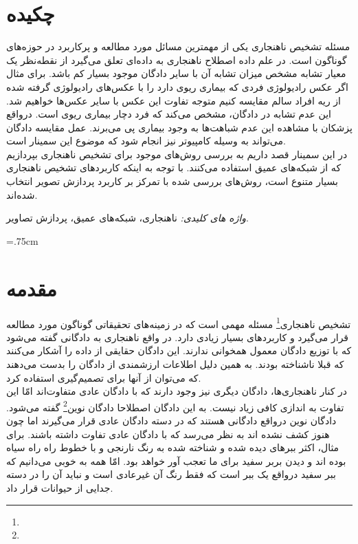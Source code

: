 \documentclass[12pt,a4paper]{article}
\theoremstyle{definition}
\theoremstyle{theorem}
\theoremstyle{definition}
\begin{document}
	
	\section*{چکیده}
	مسئله تشخیص ناهنجاری یکی از مهمترین مسائل مورد مطالعه و پر‌کاربرد در حوزه‌های گوناگون است.
	در علم داده اصطلاح ناهنجاری به داده‌ای تعلق می‌گیرد از نقطه‌نظر یک معیار
	تشابه مشخص میزان تشابه آن با سایر دادگان موجود بسیار کم باشد.
	برای مثال اگر عکس رادیولوژی فردی که بیماری ریوی دارد را با عکس‌های رادیولوژی گرفته شده از ریه افراد سالم مقایسه کنیم متوجه تفاوت
	این عکس با سایر عکس‌ها خواهیم شد. این عدم تشابه در دادگان، مشخص می‌کند  که فرد دچار بیماری ریوی است. درواقع پزشکان با مشاهده این عدم شباهت‌ها به
	وجود بیماری پی می‌برند. عمل مقایسه دادگان می‌تواند به وسیله کامپیوتر نیز انجام شود که موضوع این سمینار است.\\

	در این سمینار قصد داریم به بررسی روش‌های موجود برای تشخیص ناهنجاری بپردازیم که از شبکه‌های عمیق استفاده می‌کنند.
	با توجه به اینکه کاربر‌دهای تشخیص ناهنجاری بسیار متنوع است، روش‌های بررسی شده با تمرکز بر کاربرد پردازش تصویر انتخاب شده‌اند.

	\textit{واژه های کلیدی:}
	ناهنجاری،  شبکه‌های عمیق،  پردازش تصاویر.

	\newpage
	\baselineskip=1cm
	\tableofcontents
	\newpage
	\baselineskip=.75cm

	\section{مقدمه}

   تشخیص ناهنجاری‌\footnote{} مسئله مهمی است که در زمینه‌های تحقیقاتی گوناگون مورد مطالعه قرار می‌گیرد و کاربرد‌های بسیار زیادی دارد. در واقع ناهنجاری به دادگانی گفته می‌شود که با توزیع دادگان معمول همخوانی ندارند. این دادگان حقایقی از داده را آشکار می‌کنند که قبلا ناشناخته بودند. به همین دلیل اطلاعات ارزشمندی از دادگان را بدست می‌دهند که می‌توان از آنها برای تصمیم‌گیری‌ استفاده کرد.\\

در کنار ناهنجاری‌ها، دادگان دیگری نیز وجود دارند که با دادگان عادی متفاوت‌اند امّا این تفاوت به اندازی کافی زیاد نیست. به این دادگان اصطلاحا دادگان نوین\footnote{} گفته می‌شود. دادگان نوین درواقع دادگانی هستند که در دسته دادگان عادی قرار می‌گیرند اما چون هنوز کشف نشده اند به نظر می‌رسد که با دادگان عادی تفاوت داشته باشند. برای مثال، اکثر ببر‌های دیده شده و شناخته شده به رنگ نارنجی و با خطوط راه راه سیاه بوده اند و دیدن بربر سفید برای ما تعجب آور خواهد بود. امّا همه به خوبی می‌دانیم که ببر سفید درواقع یک ببر است که فقط رنگ آن غیرعادی است و نباید آن را در دسته جدایی از حیوانات قرار داد. \\
\end{document}
